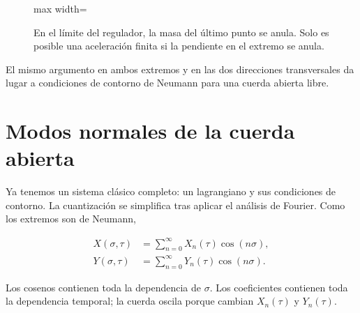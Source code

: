 \begin{figure}[H]
  \centering
  \begin{adjustbox}{max width=\linewidth}
  \end{adjustbox}
  \caption{En el límite del regulador, la masa del último punto se anula. Solo es posible una aceleración finita si la pendiente en el extremo se anula.}
  \label{fig:l02-neumann-redraw}
\end{figure}

El mismo argumento en ambos extremos y en las dos direcciones transversales da lugar a condiciones de contorno de Neumann para una cuerda abierta libre.

\section{Modos normales de la cuerda abierta}

Ya tenemos un sistema clásico completo: un lagrangiano y sus condiciones de contorno. La cuantización se simplifica tras aplicar el análisis de Fourier. Como los extremos son de Neumann,

\begin{align}
  X(\sigma,\tau)
  &=
  \sum_{n=0}^{\infty}X_n(\tau)\cos(n\sigma),
  \label{eq:l02-X-expansion}\\
  Y(\sigma,\tau)
  &=
  \sum_{n=0}^{\infty}Y_n(\tau)\cos(n\sigma).
  \label{eq:l02-Y-expansion}
\end{align}

Los cosenos contienen toda la dependencia de \(\sigma\). Los coeficientes contienen toda la dependencia temporal; la cuerda oscila porque cambian \(X_n(\tau)\) y \(Y_n(\tau)\).

